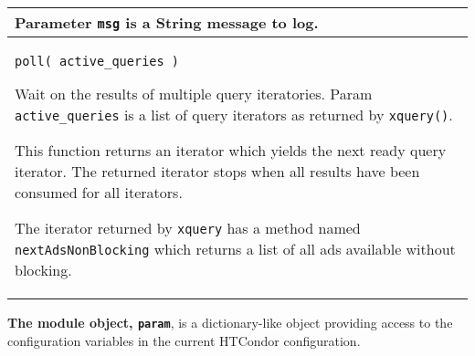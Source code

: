 \begin{flushleft}
\begin{tabular}{|p{16cm}|}
Parameter \texttt{msg} is a String message to log.

\\ \hline

\texttt{poll( active\_queries )}

Wait on the results of multiple query iteratories.  Param \texttt{active\_queries}
is a list of query iterators as returned by \texttt{xquery()}.

This function returns an iterator which yields the next ready query iterator.  The
returned iterator stops when all results have been consumed for all iterators.

The iterator returned by \texttt{xquery} has a method named \texttt{nextAdsNonBlocking}
which returns a list of all ads available without blocking.

\\ \hline

\end{tabular}
\end{flushleft}

\textbf{The module object, \texttt{param}}, is
a dictionary-like object providing access to the configuration variables
in the current HTCondor configuration.


